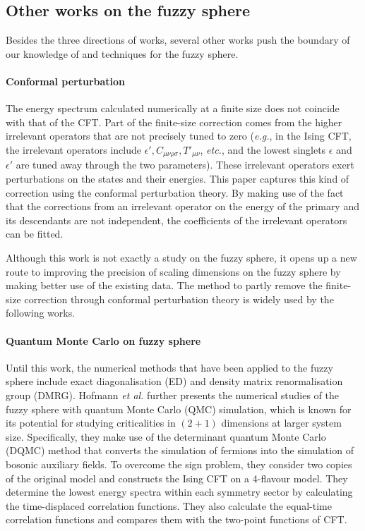 \documentclass{timesjhep}
\begin{document}
\subsection{Other works on the fuzzy sphere}

Besides the three directions of works, several other works push the boundary of our knowledge of and techniques for the fuzzy sphere. 

\paragraph{Conformal perturbation~\cite{Lao2023}}

The energy spectrum calculated numerically at a finite size does not coincide with that of the CFT. Part of the finite-size correction comes from the higher irrelevant operators that are not precisely tuned to zero (\textit{e.g.}, in the Ising CFT, the irrelevant operators include $\epsilon', C_{\mu\nu\rho\sigma}, T'_{\mu\nu}$, \textit{etc.}, and the lowest singlets $\epsilon$ and $\epsilon'$ are tuned away through the two parameters). These irrelevant operators exert perturbations on the states and their energies. This paper captures this kind of correction using the conformal perturbation theory. By making use of the fact that the corrections from an irrelevant operator on the energy of the primary and its descendants are not independent, the coefficients of the irrelevant operators can be fitted. 

Although this work is not exactly a study on the fuzzy sphere, it opens up a new route to improving the precision of scaling dimensions on the fuzzy sphere by making better use of the existing data. The method to partly remove the finite-size correction through conformal perturbation theory is widely used by the following works. 

\paragraph{Quantum Monte Carlo on fuzzy sphere~\cite{Hofmann2023}}

Until this work, the numerical methods that have been applied to the fuzzy sphere include exact diagonalisation (ED) and density matrix renormalisation group (DMRG). Hofmann \textit{et al.} further presents the numerical studies of the fuzzy sphere with quantum Monte Carlo (QMC) simulation, which is known for its potential for studying criticalities in $(2+1)$ dimensions at larger system size. Specifically, they make use of the determinant quantum Monte Carlo (DQMC) method that converts the simulation of fermions into the simulation of bosonic auxiliary fields. To overcome the sign problem, they consider two copies of the original model and constructs the Ising CFT on a 4-flavour model. They determine the lowest energy spectra within each symmetry sector by calculating the time-displaced correlation functions. They also calculate the equal-time correlation functions and compares them with the two-point functions of CFT. 
\end{document}
